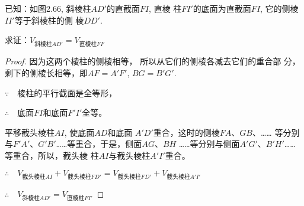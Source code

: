 \begin{example}
    已知：如图2.66, 斜棱柱$AD'$的直截面$FI$, 直棱
柱$FI'$的底面为直截面$FI$, 它的侧棱$II'$等于斜棱柱的侧
棱$DD'$.

求证：$V_{\text{斜棱柱}AD'}=V_{\text{直棱柱}FI'}$
\end{example}

\begin{proof}
因为这两个棱柱的侧棱相等，
所以从它们的侧棱各减去它们的重合部
分，剩下的侧棱长相等，即$AF=A'F'$, $BG=B'G'$.

$\because\quad $棱柱的平行截面是全等形，

$\therefore\quad $底面$FI$和底面$F'I'$全等。

平移截头棱柱$AI$, 使底面$AD$和底面
$A'D'$重合，这时的侧棱$FA$、$GB$、……
等分别与$F'A'$、$G'B'$……等重合，于是，侧面$AG$、$BH$
……等分别与侧面$A'G'$、$B'H'$……等重合，所以，截头棱
柱$AI$与截头棱柱$A'I'$重合。

$\therefore\quad V_{\text{截头棱柱}AI}+V_{\text{截头棱柱}FD'}=V_{\text{截头棱柱}FD'}+V_{\text{截头棱柱}A'I'}$

$\therefore\quad V_{\text{斜棱柱}AD'}=V_{\text{直棱柱}FI'}$
\end{proof}

